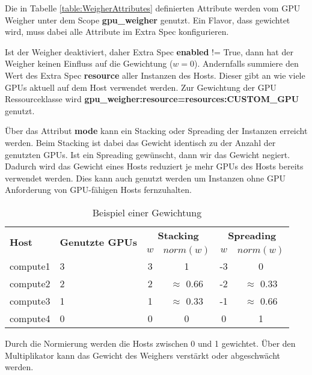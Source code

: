 \documentclass[../Main.tex]{subfiles}
\begin{document}
Die in Tabelle \ref{table:WeigherAttributes} definierten Attribute werden vom GPU Weigher
unter dem Scope \textbf{gpu\_weigher} genutzt. Ein Flavor, dass gewichtet wird, muss dabei alle Attribute
im Extra Spec konfigurieren.

Ist der Weigher deaktiviert, daher Extra Spec \textbf{enabled} != True, dann hat der Weigher keinen Einfluss auf die Gewichtung ($w = 0$).
Andernfalls summiere den Wert des Extra Spec \textbf{resource} aller Instanzen des Hosts. Dieser gibt
an wie viele GPUs aktuell auf dem Host verwendet werden. Zur Gewichtung der GPU Ressourceklasse wird \textbf{gpu\_weigher:resource=resources:CUSTOM\_GPU}
genutzt.

Über das Attribut \textbf{mode} kann ein Stacking oder Spreading der Instanzen erreicht werden. Beim Stacking
ist dabei das Gewicht identisch zu der Anzahl der genutzten GPUs. Ist ein Spreading gewünscht,
dann wir das Gewicht negiert. Dadurch wird das Gewicht eines Hosts reduziert je mehr GPUs des Hosts bereits
verwendet werden. Dies kann auch genutzt werden um Instanzen ohne GPU Anforderung von GPU-fähigen Hosts fernzuhalten.

\begin{table}[H]
  \centering
  \caption{Beispiel einer Gewichtung}
  \renewcommand{\arraystretch}{1.2}
  \begin{tabular}{|p{3cm}|p{4cm}|c|c|c|c|}
    \hline
    \multirow{2}{3cm}{\textbf{Host}} & \multirow{2}{4cm}{\textbf{Genutzte GPUs}} & \multicolumn{2}{c|}{\textbf{Stacking}} & \multicolumn{2}{c|}{\textbf{Spreading}} \\
    \cline{3-6}
    & & \textbf{$w$} & \textbf{$norm(w)$} & \textbf{$w$} & \textbf{$norm(w)$} \\
    \hline
    compute1 & 3 & 3 & \phantom{$\approx$} 1\phantom{.00} & -3 & \phantom{$\approx$} 0\phantom{.00} \\ \hline
    compute2 & 2 & 2 & $\approx$ 0.66 & -2 & $\approx$ 0.33 \\ \hline
    compute3 & 1 & 1 & $\approx$ 0.33 & -1 & $\approx$ 0.66 \\ \hline
    compute4 & 0 & 0 & \phantom{$\approx$} 0\phantom{.00} & \phantom{-}0 & \phantom{$\approx$} 1\phantom{.00} \\ \hline
  \end{tabular}
  \label{table:WeighingExample}
\end{table}

Durch die Normierung werden die Hosts zwischen 0 und 1 gewichtet. Über den Multiplikator kann das Gewicht
des Weighers verstärkt oder abgeschwächt werden.

\biblio %
\end{document}
